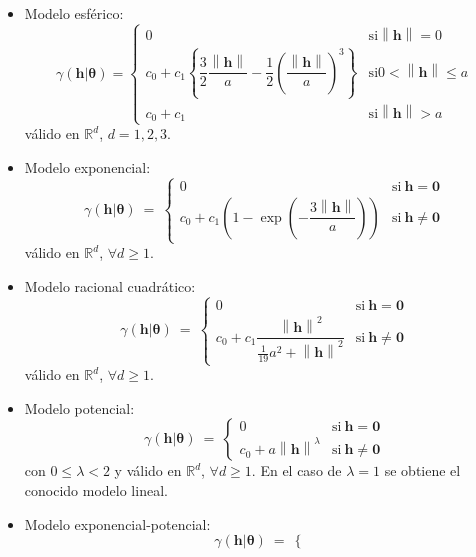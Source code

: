 \documentclass[
]{book}
\theoremstyle{break}
\theoremstyle{definition}
\theoremstyle{definition}
\theoremstyle{definition}
\theoremstyle{definition}
\theoremstyle{remark}
\begin{document}
\begin{itemize}
\item
  Modelo esférico:
  \[\gamma(\mathbf{h}\left| \boldsymbol{\theta}\right. ) = \left\{ 
  \begin{array}{ll}
  0 & \text{si} \left\| \mathbf{h}\right\| =0 \\
  c_0 +c_1 \left\{ \dfrac{3}{2} \dfrac{\left\| \mathbf{h}\right\| }{a}
  -\dfrac{1}{2} \left( \dfrac{\left\| \mathbf{h}\right\| }{a} \right)^3 \right\}  & \text{si} 0<\left\| \mathbf{h}\right\| \leq a \\
  c_0 +c_1  & \text{si} \left\| \mathbf{h}\right\| >a
  \end{array}
  \right.\]
  válido en \(\mathbb{R}^{d}\), \(d=1,2,3\).
\item
  Modelo exponencial:
  \[\gamma(\mathbf{h}\left| \boldsymbol{\theta}\right. )\ =\ \left\{ 
  \begin{array}{ll}
  0 & \text{si}\  \mathbf{h}=\mathbf{0} \\
  c_0 + c_1 \left( 1-\exp \left( -\dfrac{3\left\|
  \mathbf{h}\right\| }{a} \right) \right)  & \text{si}\  \mathbf{h}\neq
  \mathbf{0}
  \end{array}
  \right.\]
  válido en \(\mathbb{R}^{d}\), \(\forall d \geq 1\).
\item
  Modelo racional cuadrático:
  \[\gamma(\mathbf{h}\left| \boldsymbol{\theta}\right. )\ =\ \left\{ 
  \begin{array}{ll}
  0 & \text{si}\  \mathbf{h}=\mathbf{0} \\
  c_0 + c_1 \dfrac{\left\| \mathbf{h}\right\|^2
  }{\frac{1}{19} a^2 +\left\| \mathbf{h}\right\|^2 }  & \text{si}\ 
  \mathbf{h}\neq \mathbf{0}
  \end{array}
  \right.\]
  válido en \(\mathbb{R}^{d}\), \(\forall d \geq 1\).
\item
  Modelo potencial:
  \[\gamma(\mathbf{h}\left| \boldsymbol{\theta}\right. )\ =\ \left\{ 
  \begin{array}{ll}
  0 & \text{si}\  \mathbf{h}=\mathbf{0} \\
  c_0 + a\left\| \mathbf{h}\right\|^{\lambda }  & \text{si}\ 
  \mathbf{h}\neq \mathbf{0}
  \end{array}
  \right.\]
  con \(0\leq \lambda <2\) y válido en \(\mathbb{R}^{d}\), \(\forall d \geq 1\).
  En el caso de \(\lambda =1\) se obtiene el conocido modelo lineal.
\item
  Modelo exponencial-potencial:
  \[\gamma(\mathbf{h}\left| \boldsymbol{\theta}\right. )\ =\ \left\{ 
  \begin{array}{ll}

\end{array}\]
\end{itemize}
\end{document}
